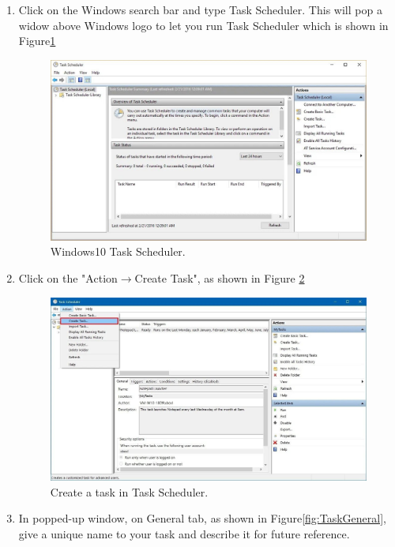 \begin{enumerate}
 
 \item Click on the Windows search bar and type Task Scheduler. This will pop
 a widow above Windows logo to let you run Task Scheduler which is shown in 
 Figure\ref{fig:TaskScheduler}
    \begin{figure}[H]
        \centering
        \includegraphics[angle=0,origin=c,width = .8\linewidth]{Section_Ethernet/Figures/Windows-10-Task-Scheduler.jpg}
        \caption{Windows10 Task Scheduler.}
        \label{fig:TaskScheduler}
    \end{figure}
 
 \item Click on the "Action$\rightarrow$Create Task", as shown in Figure
 \ref{fig:CreateTask}
    \begin{figure}[H]
        \centering
        \includegraphics[angle=0,origin=c,width = .8\linewidth]{Section_Ethernet/Figures/create-task.jpg}
        \caption{Create a task in Task Scheduler.}
        \label{fig:CreateTask}
    \end{figure}
 
 \item In popped-up window, on General tab, as shown in Figure\ref{fig:TaskGeneral}, 
 give a unique name to your task and describe it for future reference.
 

\end{enumerate}
